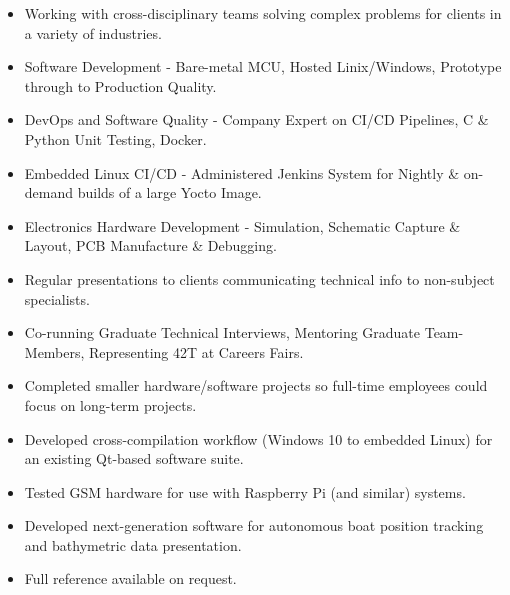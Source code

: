 
{
  {\begin{itemize}
      \item Working with cross-disciplinary teams solving complex problems for clients in a variety of industries. 
      \item Software Development - Bare-metal MCU, Hosted Linix/Windows, Prototype through to Production Quality. 
      \item DevOps and Software Quality - Company Expert on CI/CD Pipelines, C \& Python Unit Testing, Docker.
      \item Embedded Linux CI/CD - Administered Jenkins System for Nightly \& on-demand builds of a large Yocto Image.
      \item Electronics Hardware Development - Simulation, Schematic Capture \& Layout, PCB Manufacture \& Debugging.
      \item Regular presentations to clients communicating technical info to non-subject specialists.
      \item Co-running Graduate Technical Interviews, Mentoring Graduate Team-Members, Representing 42T at Careers Fairs. 
  \end{itemize}
  }
}
  
{
  {\begin{itemize}
      \item Completed smaller hardware/software projects so full-time employees could focus on long-term projects.
      \item Developed cross-compilation workflow (Windows 10 to embedded Linux) for an existing Qt-based software suite.
      \item Tested GSM hardware for use with Raspberry Pi (and similar) systems.   
      \item Developed next-generation software for autonomous boat position tracking and bathymetric data presentation.
      \item Full reference available on request.
  \end{itemize}
  }
}

